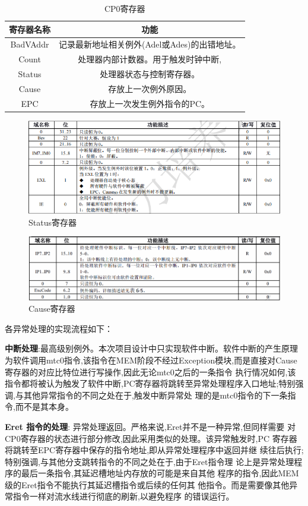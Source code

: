 \begin{table}
\centering
\begin{tabular}{|c|c|} \hline 
	寄存器名称& 功能\\ \hline 
	BadVAddr& 记录最新地址相关例外(Adel或Ades)的出错地址。\\ \hline 
	Count& 处理器内部计数器。用于触发时钟中断,\\ \hline 
	Status& 处理器状态与控制寄存器。\\ \hline 
	Cause& 存放上一次例外原因。\\ \hline
	EPC&存放上一次发生例外指令的PC。\\\hline
\end{tabular}
\caption{CP0寄存器}
\label{tab:my_label}
\end{table}

\begin{figure}
\centering
\includegraphics[width=0.5\linewidth]{image/P6.png}
\caption{Status寄存器}
\label{fig:enter-label}
\end{figure}
\begin{figure}
\centering
\includegraphics[width=0.5\linewidth]{image/P7.png}
\caption{Cause寄存器}
\label{fig:enter-label}
\end{figure}
各异常处理的实现流程如下：

\textbf{中断处理}:最高级别例外。本次项目设计中只实现软件中断。软件中断的产生原理为软件调用mtc0指令,该指令在MEM阶段不经过Exception模块,而是直接对Cause寄存器的对应比特位进行写操作,因此无论mtc0之后的一条指令 执行情况如何,该指令都将被认为触发了软件中断,PC寄存器将跳转至异常处理程序入口地址;特别强调,与其他异常指令的不同之处在于,触发中断异常处 理的是mtc0指令的下一条指令,而不是其本身。 

\textbf{Eret 指令的处理}: 异常处理返回。严格来说,Eret并不是一种异常,但同样需要 对CP0寄存器的状态进行部分修改,因此采用类似的处理。该异常触发时,PC 寄存器将跳转至EPC寄存器中保存的指令地址,即从异常处理程序中返回并继 续往后执行;特别强调,与其他分支跳转指令的不同之处在于,由于Eret指令理 论上是异常处理程序的最后一条指令,其延迟槽地址内存放的可能是来自其他 程序的指令,因此MEM级的Eret指令不能执行其延迟槽指令或后续的任何其 他指令。而是需要像其他异常指令一样对流水线进行彻底的刷新,以避免程序 的错误运行。 

